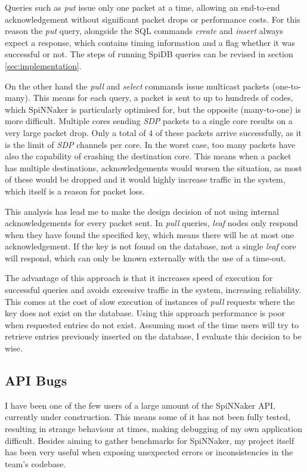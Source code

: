 Queries such as \textit{put} issue only one packet at a time, allowing an end-to-end acknowledgement without significant packet drops or performance costs. For this reason the \textit{put} query, alongside the SQL commands \textit{create} and \textit{insert} always expect a response, which contains timing information and a flag whether it was successful or not. The steps of running SpiDB queries can be revised in section \ref{sec:implementation}.

On the other hand the \textit{pull} and \textit{select} commands issue multicast packets (one-to-many). This means for each query, a packet is sent to up to hundreds of codes, which SpiNNaker is particularly optimised for, but the opposite (many-to-one) is more difficult. Multiple cores sending \textit{SDP} packets to a single core results on a very large packet drop. Only a total of 4 of these packets arrive successfully, as it is the limit of \textit{SDP} channels per core. In the worst case, too many packets have also the capability of crashing the destination core.
This means when a packet has multiple destinations, acknowledgements would worsen the situation, as most of these would be dropped and it would highly increase traffic in the system, which itself is a reason for packet loss.

This analysis has lead me to make the design decision of not using internal acknowledgements for every packet sent. In \textit{pull} queries, \textit{leaf} nodes only respond when they have found the specified key, which means there will be at most one acknowledgement. If the key is not found on the database, not a single \textit{leaf} core will respond, which can only be known externally with the use of a time-out.

The advantage of this approach is that it increases speed of execution for successful queries and avoids excessive traffic in the system, increasing reliability. This comes at the cost of slow execution of instances of \textit{pull} requests where the key does not exist on the database. Using this approach performance is poor when requested entries do not exist. Assuming most of the time users will try to retrieve entries previously inserted on the database, I evaluate this decision to be wise.

\subsection{API Bugs}
I have been one of the few users of a large amount of the SpiNNaker API, currently under construction. This means some of it has not been fully tested, resulting in strange behaviour at times, making debugging of my own application difficult. Besides aiming to gather benchmarks for SpiNNaker, my project itself has been very useful when exposing unexpected errors or inconsistencies in the team's codebase.

